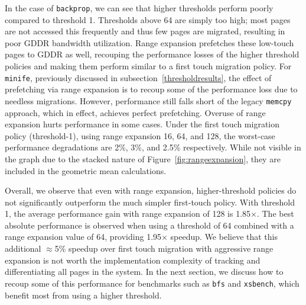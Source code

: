 In the case of {\tt backprop}, we can see that higher thresholds perform poorly
compared to threshold 1. Thresholds above 64 are simply too high; most pages are not accessed
this frequently and thus few pages are migrated, resulting in poor GDDR bandwidth utilization.
Range expansion prefetches these low-touch pages to GDDR as well, recouping the performance losses 
of the higher threshold policies and making them perform similar to a first touch migration policy.
For {\tt minife}, previously discussed in subsection~\ref{thresholdresults}, the effect of prefetching
via range expansion is to recoup some of the performance loss due to needless migrations. However,
performance still falls short of the legacy {\tt memcpy} approach, which in effect, achieves perfect prefetching.
Overuse of range expansion hurts performance in some cases. Under the 
first touch migration policy (threshold-1), using range expansion 16, 64, and 128, the worst-case
performance degradations are 2\%, 3\%, and 2.5\% respectively. While not visible in the graph due to the stacked
nature of Figure~\ref{fig:rangeexpansion}, they are included in the geometric mean calculations.

Overall, we observe that even with range expansion, higher-threshold policies
do not significantly outperform the much simpler first-touch policy. 
With threshold 1, the average performance gain with range expansion of 128 is
1.85$\times$.  The best absolute performance is observed when using a threshold of
64 combined with a range expansion value of 64, providing 1.95$\times$ speedup.
We believe that this additional $\approx$5\% speedup over first touch migration with
aggressive range expansion is not worth the implementation complexity of
tracking and differentiating all pages in the system. In the next section, we discuss how
to recoup some of this performance for benchmarks such as {\tt bfs} and {\tt xsbench}, which 
benefit most from using a higher threshold.

